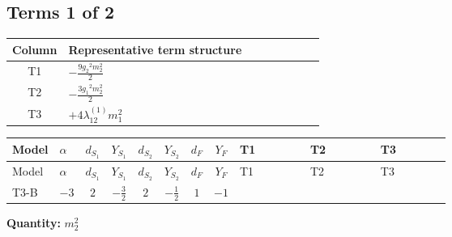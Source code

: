\documentclass[8pt]{article}
\begin{document}
\begin{landscape}
\subsection*{Terms 1 of 2}
\begin{center}
\begin{tabular}{@{}c >{\raggedright\arraybackslash}p{0.82\linewidth}@{}}
\toprule
Column & Representative term structure \\
\midrule
T1 & \(\displaystyle -\frac{9 {g_2}^2 {m_2^2}}{2}\) \\
\midrule
T2 & \(\displaystyle -\frac{3 {g_1}^2 {m_2^2}}{2}\) \\
\midrule
T3 & \(\displaystyle +4 {\lambda_{12}^{(1)}} {m_1^2}\) \\
\midrule
\bottomrule
\end{tabular}
\end{center}
\smallskip
\tiny
\begin{longtable}{@{}llcccccc >{\raggedright\arraybackslash}p{0.21\linewidth} >{\raggedright\arraybackslash}p{0.21\linewidth} >{\raggedright\arraybackslash}p{0.21\linewidth}@{}}
\toprule
Model & $\alpha$ & $d_{S_1}$ & $Y_{S_1}$ & $d_{S_2}$ & $Y_{S_2}$ & $d_F$ & $Y_F$ & T1 & T2 & T3 \\
\midrule
\endfirsthead
\toprule
Model & $\alpha$ & $d_{S_1}$ & $Y_{S_1}$ & $d_{S_2}$ & $Y_{S_2}$ & $d_F$ & $Y_F$ & T1 & T2 & T3 \\
\midrule
\endhead
T3-B & $-3$ & $2$ & $-\frac{3}{2}$ & $2$ & $-\frac{1}{2}$ & $1$ & $-1$ & \scriptsize\adjustbox{max width=\linewidth}{$\begin{gathered} -\frac{9 {g_2}^2 {m_2^2}}{2}\end{gathered}$} & \scriptsize\adjustbox{max width=\linewidth}{$\begin{gathered} -\frac{3 {g_1}^2 {m_2^2}}{2}\end{gathered}$} & \scriptsize\adjustbox{max width=\linewidth}{$\begin{gathered} +4 {\lambda_{12}^{(1)}} {m_1^2}\end{gathered}$} \\
\midrule
\bottomrule
\end{longtable}
\clearpage
\noindent\textbf{Quantity: }$m_2^2$\par\smallskip

\end{landscape}
\end{document}
